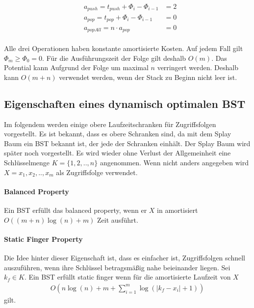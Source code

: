 \documentclass[a4paper,12pt]{article}
\begin{document}
\begin{align*}   
&a_{\mathit{push}} = t_{\mathit{push}} + \Phi_{i} - \Phi_{i-1}  &= 2\\
&a_{\mathit{pop}} = t_{\mathit{pop}} + \Phi_{i} - \Phi_{i-1}  &= 0\\
&a_{\mathit{popAll}} = n \cdot a_{\mathit{pop}} &= 0
\end{align*}\\
Alle drei Operationen haben konstante amortisierte Kosten. Auf jedem Fall gilt $ \Phi_m \geq  \Phi_0 = 0 $. Für die Ausführungszeit der Folge gilt deshalb $O(m)$. Das Potential kann Aufgrund der Folge um maximal $n$ verringert werden. Deshalb kann $O\left(m + n\right)$ verwendet werden, wenn der Stack zu Beginn nicht leer ist.  \\



\subsection{Eigenschaften eines dynamisch optimalen BST }\label{upperBounds}
Im folgendem werden einige obere Laufzeitschranken für Zugriffsfolgen vorgestellt. Es ist bekannt, dass es obere Schranken sind, da mit dem Splay Baum ein BST bekannt ist, der jede der Schranken einhält. Der Splay Baum wird später noch vorgestellt. Es wird wieder ohne Verlust der Allgemeinheit eine Schlüsselmenge $K = \{1,2,..,n\}$ angenommen. Wenn nicht anders angegeben wird  $X = x_1,x_2,..,x_m$ als Zugriffsfolge verwendet. 


\paragraph{Balanced Property}
Ein BST erfüllt das balanced property, wenn er $X$ in amortisiert $O\left(\left(m + n\right) \log \left( n\right) + m \right)$ Zeit ausführt. 

\paragraph{Static Finger Property}
Die Idee hinter dieser Eigenschaft ist, dass es einfacher ist, Zugriffsfolgen schnell auszuführen, wenn ihre Schlüssel betragsmäßig nahe beieinander liegen. 
Sei $k_f \in K$. Ein BST erfüllt static finger wenn für die amortisierte Laufzeit von $X$ 
\begin{align*}
O\left( n \log\left( n\right) +m + \sum_{i = 1}^{m} \log \left( \vert k_f - x_i  \vert	+ 1	\right)\right)
\end{align*}
gilt. 
\end{document}
